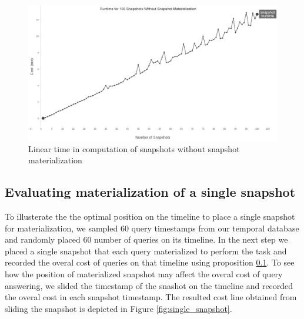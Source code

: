 \begin{figure}
	\centering
	\includegraphics[width=\textwidth]{figs/runtime.jpg}
	\caption{Linear time in computation of snapshots without snapshot materialization}
	\label{fig:linear_time}
\end{figure} 

\subsection{Evaluating materialization of a single snapshot}
To illusterate the the optimal position on the timeline to place a single snapshot for materialization, we sampled 60 query timestamps from our temporal database and randomly placed 60 number of queries on its timeline. In the next step we placed a single snapshot that each query materialized to perform the task and recorded the overal cost of queries on that timeline using proposition \ref{}. To see how the position of materialized snapshot may affect the overal cost of query answering, we slided the timestamp of the snashot on the timeline and recorded the overal cost in each snapshot timestamp. The resulted cost line obtained from sliding the snapshot is depicted in Figure \ref{fig:single_snapshot}. 

